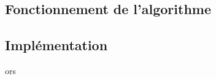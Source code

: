 
\newcommand{\al}{"arbre des last" }
\newcommand{\fn}[1]{"file des next" }
\newcommand{\tokr}{<Token Request> }
\newcommand{\tok}{<Token> }


\subsection{Fonctionnement de l'algorithme}
\subsection{Implémentation}
ors
